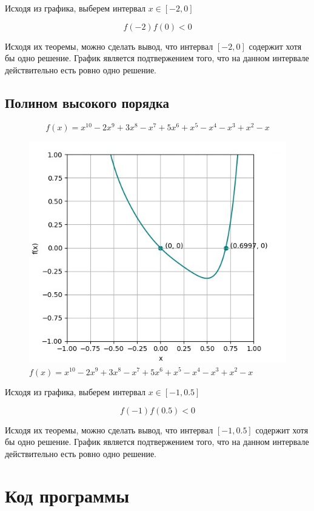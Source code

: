 \documentclass[a4paper,12pt]{extarticle}
\begin{document}
    Исходя из графика, выберем интервал $x \in [-2, 0]$

    \[
        f(-2)f(0) < 0
    \]

    Исходя их теоремы, можно сделать вывод, что интервал $[-2, 0]$ содержит хотя бы одно решение.
    График является подтвержением того, что на данном интервале действительно есть ровно одно решение.

    \newpage

    \subsection{Полином высокого порядка}

    \[
        f(x) = x^{10} - 2x^9 + 3x^8 - x^7 + 5x^6 + x^5 - x^4 - x^3 + x^2 - x
    \]

    \begin{figure}[h!]
        \centering
        \includegraphics[height=0.6\linewidth]{plot3_3}
        \caption{$f(x) = x^{10} - 2x^9 + 3x^8 - x^7 + 5x^6 + x^5 - x^4 - x^3 + x^2 - x$}
    \end{figure}

    Исходя из графика, выберем интервал $x \in [-1, 0.5]$

    \[
        f(-1)f(0.5) < 0
    \]

    Исходя их теоремы, можно сделать вывод, что интервал $[-1, 0.5]$ содержит хотя бы одно решение.
    График является подтвержением того, что на данном интервале действительно есть ровно одно решение.

    \newpage


    \section{Код программы}
\end{document}
